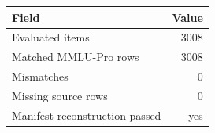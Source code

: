 \begin{tabular}{lr}
\toprule
Field & Value \\
\midrule
Evaluated items & 3008 \\
Matched MMLU-Pro rows & 3008 \\
Mismatches & 0 \\
Missing source rows & 0 \\
Manifest reconstruction passed & yes \\
\bottomrule
\end{tabular}
